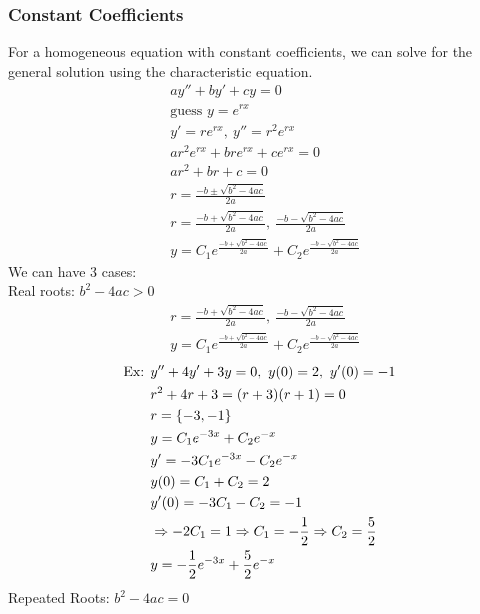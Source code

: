 \documentclass[11pt, fleqn]{article}
\begin{document}
\subsubsection{Constant Coefficients}
For a homogeneous equation with constant coefficients, we can solve for the general solution using the characteristic equation.
\begin{align*}
    &ay''+by'+cy=0\\
    &\text{guess }y=e^{rx}\\
    &y'=re^{rx},\ y''=r^2e^{rx}\\
    &ar^2e^{rx}+bre^{rx}+ce^{rx}=0\\
    &ar^2+br+c=0\\
    &r=\frac{-b\pm\sqrt{b^2-4ac}}{2a}\\
    &r=\frac{-b+\sqrt{b^2-4ac}}{2a},\ \frac{-b-\sqrt{b^2-4ac}}{2a}\\
    &y=C_1e^{\frac{-b+\sqrt{b^2-4ac}}{2a}}+C_2e^{\frac{-b-\sqrt{b^2-4ac}}{2a}}
\end{align*}
We can have 3 cases:\\
Real roots: $b^2-4ac>0$\\
\begin{align*}
    &r=\frac{-b+\sqrt{b^2-4ac}}{2a},\ \frac{-b-\sqrt{b^2-4ac}}{2a}\\
    &y=C_1e^{\frac{-b+\sqrt{b^2-4ac}}{2a}}+C_2e^{\frac{-b-\sqrt{b^2-4ac}}{2a}}
\end{align*}
\begin{align*}
    \text{Ex: }&y''+4y'+3y=0,\ y(0)=2,\ y'(0)=-1\\
    &r^2+4r+3=(r+3)(r+1)=0\\
    &r=\{-3,-1\}\\
    &y=C_1e^{-3x}+C_2e^{-x}\\
    &y'=-3C_1e^{-3x}-C_2e^{-x}\\
    &y(0)=C_1+C_2=2\\
    &y'(0)=-3C_1-C_2=-1\\
    &\Rightarrow -2C_1=1\Rightarrow C_1=-\frac{1}{2}\Rightarrow C_2=\frac{5}{2}\\
    &y=-\frac{1}{2}e^{-3x}+\frac{5}{2}e^{-x}
\end{align*}
Repeated Roots: $b^2-4ac=0$
\end{document}
